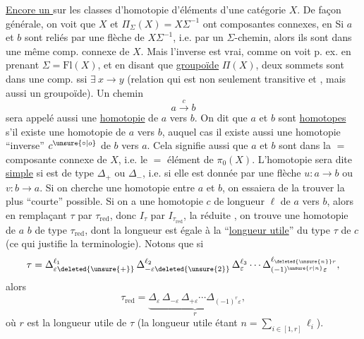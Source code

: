 \uline{Encore un } sur les classes d'homotopie d'éléments d'une catégorie $X$. De façon générale, on voit que  $X$ et $\Pi_\Sigma(X)=X\Sigma^{-1}$ ont   composantes connexes, en 
Si $a$ et $b$  sont reliés par une flèche de $X\Sigma^{-1}$, i.e. par un $\Sigma$-chemin, alors ils sont dans une même comp. connexe de $X$. Mais l'inverse est  vrai, comme on voit p. ex. en prenant $\Sigma=\mathrm{Fl}(X)$, et en disant que  \uline{groupoïde} $\Pi(X)$,  deux sommets sont dans une  comp.
ssi $\exists\ x\longrightarrow y$ (relation qui est non seulement transitive et , mais aussi   un groupoïde). Un chemin
\[a\xrightarrow{c}b\]
sera appelé aussi une \uline{homotopie} de $a$ vers $b$. On dit que $a$ et $b$ sont \uline{homotopes} s'il existe une  homotopie  de $a$ vers $b$, auquel cas il existe aussi une homotopie  ``inverse'' $c^{\unsure{\circ|o}}$ de $b$ vers $a$. Cela signifie aussi que $a$ et $b$ sont dans la $=$ composante connexe de $X$, i.e.  le $=$ élément de $\pi_0(X)$.
L'homotopie sera dite \uline{simple} si  est de type $\Delta_+$ ou $\Delta_-$, i.e. si elle est donnée par une flèche $u:a\longrightarrow b$ ou $v:b\longrightarrow a$. Si on cherche une homotopie entre $a$ et $b$, on essaiera de la trouver la plus ``courte'' possible. Si on a une homotopie $c$ de longueur $\ell$ de $a$ vers $b$, alors en remplaçant $\tau$ par $\tau_{\mathrm{red}}$, donc $I_\tau$ par $I_{\tau_{\mathrm{red}}}$, la  réduite
,  on trouve une homotopie de $a$  $b$ de type $\tau_{\mathrm{red}}$, dont la longueur est égale à la ``\uline{longueur utile}'' du type $\tau$ de $c$ (ce qui justifie la terminologie).
Notons que si
\[\tau=\Delta_{\varepsilon\deleted{\unsure{+}}}^{\ell_1}\,\Delta_{-\varepsilon\deleted{\unsure{2}}}^{\ell_2}\,\Delta_\varepsilon^{\ell_3}\cdots\Delta_{(-1)^{\unsure{r|n}}\varepsilon}^{\ell_{\deleted{\unsure{n}}r}},\]
alors
\[\tau_{\mathrm{red}}=\underbrace{\Delta_\varepsilon\,\Delta_{-\varepsilon}\,\Delta_{+\varepsilon}\cdots\Delta_{(-1)^r\varepsilon}}_{r},\]
où $r$ est la longueur utile de $\tau$ (la longueur  utile étant $n=\sum_{i\in[1,r]}\ell_i$).

